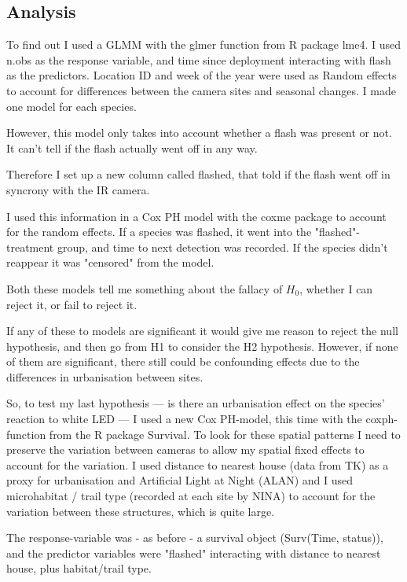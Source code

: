 \subsection{Analysis} %

To find out I used a GLMM with the glmer function from R package lme4.
I used n.obs as the response variable, and time since deployment interacting with flash as the predictors.
Location ID and week of the year were used as Random effects to account for differences between the camera sites and seasonal changes.
I made one model for each species.

However, this model only takes into account whether a flash was present or not. It can't tell if the flash actually went off in any way.

Therefore I set up a new column called flashed, that told if the flash went off in syncrony with the IR camera.



I used this information in a Cox PH model with the coxme package to account for the random effects.
If a species was flashed, it went into the "flashed"-treatment group, and time to next detection was recorded. 
If the species didn't reappear it was "censored" from the model.

Both these models tell me something about the fallacy of $H_0$, whether I can reject it, or fail to reject it.

If any of these to models are significant it would give me reason to reject the null hypothesis, and then go from H1 to consider the H2 hypothesis.
However, if none of them are significant, there still could be confounding effects due to the differences in urbanisation between sites. %

So, to test my last hypothesis --- is there an urbanisation effect on the species' reaction to white LED --- I used a new Cox PH-model, this time with the coxph-function from the R package Survival.
To look for these spatial patterns I need to preserve the variation between cameras to allow my spatial fixed effects to account for the variation.
I used distance to nearest house (data from TK) as a proxy for urbanisation and Artificial Light at Night (ALAN) and I used microhabitat / trail type (recorded at each site by NINA) to account for the variation between these structures, which is quite large.

The response-variable was - as before - a survival object (Surv(Time, status)), and the predictor variables were "flashed" interacting with distance to nearest house, plus habitat/trail type.
